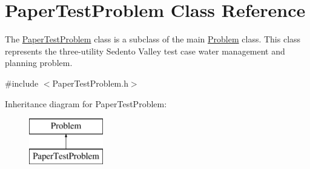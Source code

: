 \hypertarget{classPaperTestProblem}{}\section{Paper\+Test\+Problem Class Reference}
\label{classPaperTestProblem}


The {\ttfamily \mbox{\hyperlink{classPaperTestProblem}{Paper\+Test\+Problem}}} class is a subclass of the main {\ttfamily \mbox{\hyperlink{classProblem}{Problem}}} class. This class represents the three-\/utility Sedento Valley test case water management and planning problem.  




{\ttfamily \#include $<$Paper\+Test\+Problem.\+h$>$}

Inheritance diagram for Paper\+Test\+Problem\+:\begin{figure}[H]
\begin{center}
\leavevmode
\includegraphics[height=2.000000cm]{classPaperTestProblem}
\end{center}
\end{figure}
